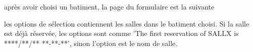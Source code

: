 \documentclass{article}
\begin{document}
\begin{enumerate}
  \vspace{0.7cm}
   
\hspace*{-0.7in}
               \noindent{}  
  
  après avoir choisi un batiment, la page du formulaire est la suivante
  
  
  \vspace{0.7cm}
   
\hspace*{-0.7in}
               \noindent{}   
  
  les options de sélection contiennent les salles dans le batiment choisi. Si la salle est déjà réservée, les options sont comme 'The first reservation of SALLX is ****/**/** **-**-**', sinon l'option est le nom de salle.
  

\end{enumerate}
\end{document}
